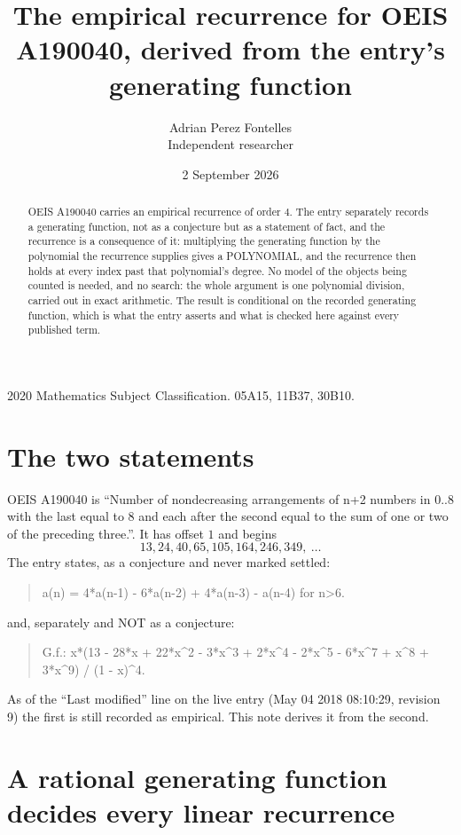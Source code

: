 \documentclass[11pt,a4paper]{article}
\title{The empirical recurrence for OEIS A190040, derived from the entry's generating function}
\author{Adrian Perez Fontelles\\ \small Independent researcher}
\date{2 September 2026}
\theoremstyle{plain}
\theoremstyle{definition}
\begin{document}
\maketitle

\begin{abstract}
OEIS A190040 carries an empirical recurrence of order $4$. The entry separately records a
generating function, not as a conjecture but as a statement of fact, and the recurrence is a
consequence of it: multiplying the generating function by the polynomial the recurrence
supplies gives a POLYNOMIAL, and the recurrence then holds at every index past that
polynomial's degree. No model of the objects being counted is needed, and no search: the
whole argument is one polynomial division, carried out in exact arithmetic. The result is
conditional on the recorded generating function, which is what the entry asserts and what is
checked here against every published term.
\end{abstract}

\noindent\small 2020 Mathematics Subject Classification. 05A15, 11B37, 30B10.\normalsize

\section{The two statements}

OEIS A190040 is ``Number of nondecreasing arrangements of n+2 numbers in 0..8 with the last equal to 8 and each after the second equal to the sum of one or two of the preceding three.''. It has offset $1$ and begins
\[
13, 24, 40, 65, 105, 164, 246, 349,\ \dots
\]
The entry states, as a conjecture and never marked settled:
\begin{quote}
a(n) = 4*a(n-1) - 6*a(n-2) + 4*a(n-3) - a(n-4) for n>6.
\end{quote}
and, separately and NOT as a conjecture:
\begin{quote}
G.f.: x*(13 - 28*x + 22*x\^{}2 - 3*x\^{}3 + 2*x\^{}4 - 2*x\^{}5 - 6*x\^{}7 + x\^{}8 + 3*x\^{}9) / (1 - x)\^{}4.
\end{quote}
As of the ``Last modified'' line on the live entry (May 04 2018 08:10:29, revision 9) the first is still
recorded as empirical. This note derives it from the second.

\section{A rational generating function decides every linear recurrence}
\end{document}
